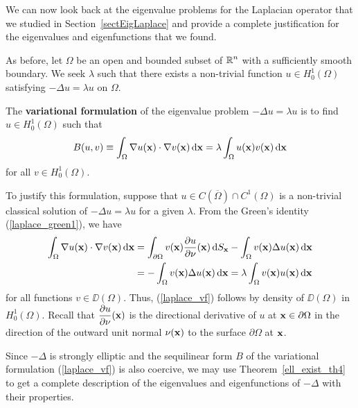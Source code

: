 We can now look back at the eigenvalue problems for the Laplacian
operator that we studied in Section~\ref{sectEigLaplace} and provide a
complete justification for the eigenvalues and eigenfunctions that we
found.

As before, let $\Omega$ be an open and bounded subset of
$\displaystyle \mathbb{R}^n$ with a sufficiently smooth boundary.
We seek $\lambda$ such that there exists a non-trivial
function $\displaystyle u \in H^1_0(\Omega)$ satisfying
$-\Delta u = \lambda u$ on $\Omega$.

The {\bfseries variational formulation}%
 of the eigenvalue problem
$-\Delta u = \lambda u$ is to find
$\displaystyle u \in H^1_0(\Omega)$ such that
\begin{equation} \label{laplace_vf}
B(u,v) \equiv \int_{\Omega} \nabla u(\mathbf{x})\cdot \nabla v(\mathbf{x})
\,\mathrm{d}{\mathbf{x}}
= \lambda \int_{\Omega} u(\mathbf{x}) v(\mathbf{x}) \,\mathrm{d}{\mathbf{x}}
\end{equation}
for all $\displaystyle v \in H^1_0(\Omega)$.

To justify this formulation, suppose that
$\displaystyle u \in C(\overline{\Omega})\cap C^1(\Omega)$ is a
non-trivial classical solution of $-\Delta u = \lambda u$ for a given $\lambda$.
From the Green's identity (\ref{laplace_green1}), we have
\begin{align*}
\int_\Omega \nabla u(\mathbf{x}) \cdot \nabla v(\mathbf{x}) \,\mathrm{d}{\mathbf{x}}
&= \int_{\partial \Omega} v(\mathbf{x})
\frac{\partial{u}}{\partial \mathbf{\nu}}(\mathbf{x}) \,\mathrm{d}{S}_{\mathbf{x}} -
\int_{\Omega} v(\mathbf{x}) \Delta u(\mathbf{x}) \,\mathrm{d}{\mathbf{x}} \\
&= - \int_{\Omega} v(\mathbf{x}) \Delta u(\mathbf{x}) \,\mathrm{d}{\mathbf{x}}
= \lambda \int_{\Omega} v(\mathbf{x}) u(\mathbf{x}) \,\mathrm{d}{\mathbf{x}}
\end{align*}
for all functions $v \in \DD(\Omega)$.  Thus,
(\ref{laplace_vf}) follows by density of $\DD(\Omega)$ in
$\displaystyle H_0^1(\Omega)$.  Recall that
$\displaystyle \frac{\partial{u}}{\partial \mathbf{\nu}}(\mathbf{x})$ is the directional
derivative of $u$ at $\mathbf{x}\in \partial \Omega$ in the direction of
the outward unit normal $\mathbf{\nu}(\mathbf{x})$ to the surface
$\partial \Omega$ at $\mathbf{x}$.

Since $-\Delta$ is strongly elliptic and the sequilinear form $B$ of
the variational formulation (\ref{laplace_vf}) is also coercive, we
may use Theorem~\ref{ell_exist_th4} to get a complete description of
the eigenvalues and eigenfunctions of $-\Delta$ with their properties.

